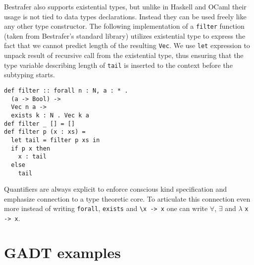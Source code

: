 \documentclass[declaration,shortabstract,english]{iithesis}
\begin{document}
Bestrafer also supports existential types, but unlike in Haskell and OCaml their usage is not tied to data types declarations.
Instead they can be used freely like any other type constructor. The following implementation of a \verb+filter+ function
(taken from Bestrafer's standard library) utilizes existential type to express the fact that we cannot predict length of
the resulting \verb+Vec+. We use \verb+let+ expression to unpack result of recursive call from the existential type, thus
ensuring that the type variable describing length of \verb+tail+ is inserted to the context before the subtyping starts.
\begin{verbatim}
def filter :: forall n : N, a : * .
  (a -> Bool) ->
  Vec n a ->
  exists k : N . Vec k a
def filter _ [] = []
def filter p (x : xs) =
  let tail = filter p xs in
  if p x then
    x : tail
  else
    tail
\end{verbatim}

Quantifiers are always explicit to enforce conscious kind specification and emphasize connection to a type theoretic core.
To articulate this connection even more instead of writing \verb+forall+, \verb+exists+ and \verb+\x -> x+ one can write
$\forall$, $\exists$ and $\lambda$ \verb+x -> x+.
\section{GADT examples}
\end{document}
